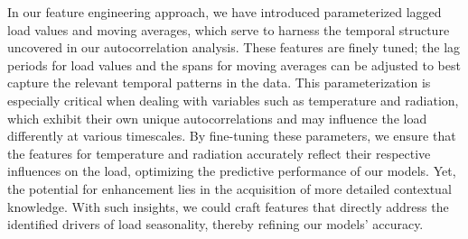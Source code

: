 \documentclass{article} %
\begin{document}
In our feature engineering approach, we have introduced parameterized lagged load values and moving averages, which serve to harness the temporal structure uncovered in our autocorrelation analysis. These features are finely tuned; the lag periods for load values and the spans for moving averages can be adjusted to best capture the relevant temporal patterns in the data. This parameterization is especially critical when dealing with variables such as temperature and radiation, which exhibit their own unique autocorrelations and may influence the load differently at various timescales. By fine-tuning these parameters, we ensure that the features for temperature and radiation accurately reflect their respective influences on the load, optimizing the predictive performance of our models. Yet, the potential for enhancement lies in the acquisition of more detailed contextual knowledge. With such insights, we could craft features that directly address the identified drivers of load seasonality, thereby refining our models' accuracy. 
\end{document}

